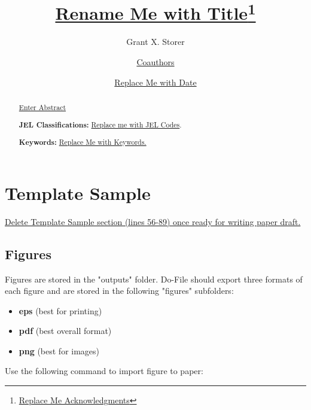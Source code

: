 \documentclass[12pt]{article}
\begin{document}
\title{\underline{Rename Me with Title}\thanks{\noindent \underline{Replace Me Acknowledgments}}}

\author{Grant X. Storer \and \underline{Coauthors}}

\date{\underline{Replace Me with Date}}

\maketitle

\begin{abstract}
\underline{Enter Abstract}

\bigskip

\noindent \textbf{JEL Classifications:} \underline{Replace me with JEL Codes}.

\noindent \textbf{Keywords:} \underline{ Replace Me with Keywords.}
\end{abstract}

\bigskip \pagebreak


\section{Template Sample}

\underline{Delete Template Sample section (lines 56-89) once ready for writing paper draft.}

\subsection{Figures}

Figures are stored in the "outputs" folder. Do-File should export three formats of each figure and are stored in the following "figures" subfolders:

\begin{itemize}
	\item \textbf{eps} (best for printing)
	\item \textbf{pdf} (best overall format)
	\item \textbf{png} (best for images)
\end{itemize}


Use the following command to import figure to paper: 
\end{document}
